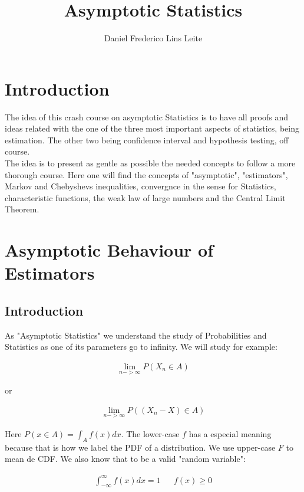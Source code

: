 \documentclass[10pt,a4paper]{book}
\author{Daniel Frederico Lins Leite}
\title{Asymptotic Statistics}
\begin{document}
\maketitle
\tableofcontents

\chapter {Introduction}

The idea of this crash course on asymptotic Statistics is to have all proofs and ideas related with the one of the three most important aspects of statistics, being estimation. The other two being confidence interval and hypothesis testing, off course.\\

The idea is to present as gentle as possible the needed concepts to follow a more thorough course. Here one will find the concepts of "asymptotic", "estimators", Markov and Chebyshevs inequalities, convergnce in the sense for Statistics, characteristic functions, the weak law of large numbers and the Central Limit Theorem.
	
\chapter{Asymptotic Behaviour of Estimators}
\section{Introduction}

As "Asymptotic Statistics" we understand the study of Probabilities and Statistics as one of its parameters go to infinity. We will study for example:

\begin{align}
	\lim_{n->\infty}{P(X_n \in A)}
\end{align}

or 

\begin{align}
	\lim_{n->\infty}{P((X_n - X) \in A)}
\end{align}

Here $P(x \in A) = \int_{A}{f(x)dx}$. The lower-case $f$ has a especial meaning because that is how we label the PDF of a distribution. We use upper-case $F$ to mean de CDF. We also know that to be a valid "random variable":

\begin{align}
	\int_{-\infty}^{\infty}{f(x)dx} = 1 && f(x) \ge 0
\end{align}
\end{document}
